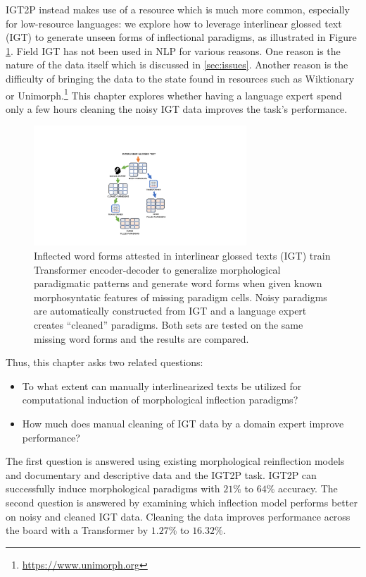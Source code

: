 IGT2P instead makes use of a resource which is much more common, especially for low-resource languages:
we explore how to leverage interlinear glossed text (IGT) to generate unseen forms of inflectional paradigms, as illustrated in Figure \ref{fig:Workflow}. Field IGT has not been used in NLP for various reasons. One reason is the nature of the data itself which is discussed in \ref{sec:issues}. Another reason is the difficulty of bringing the data to the state found in resources such as Wiktionary or Unimorph.\footnote{\url{https://www.unimorph.org}} This chapter explores whether having a language expert spend only a few hours cleaning the noisy IGT data improves the task's performance. 


\begin{figure}[!tb]
    \centering
    \includegraphics[width=8cm]{figs/IGT-Paradigm-Workflow2.pdf}
    \caption[IGT2P Overview]{Inflected word forms attested in interlinear glossed texts (IGT) train Transformer encoder-decoder to generalize morphological paradigmatic patterns and generate word forms when given known morphosyntatic features of missing paradigm cells. Noisy paradigms are automatically constructed from IGT and a language expert creates ``cleaned'' paradigms. Both sets are tested on the same missing word forms and the results are compared.}
    \label{fig:Workflow}
\end{figure}


Thus, this chapter asks two related questions: 
\begin{itemize}
    \item To what extent can manually interlinearized texts be utilized for computational induction of morphological inflection paradigms? 
    \item How much does manual cleaning of IGT data by a domain expert improve performance?
\end{itemize}

The first question is answered using existing morphological reinflection models and documentary and descriptive data and the IGT2P task. IGT2P can successfully induce morphological paradigms with $21\%$ to $64\%$ accuracy. The second question is answered by examining which inflection model performs better on noisy and cleaned IGT data. Cleaning the data improves performance across the board with a Transformer by $1.27\%$ to $16.32\%$. 


